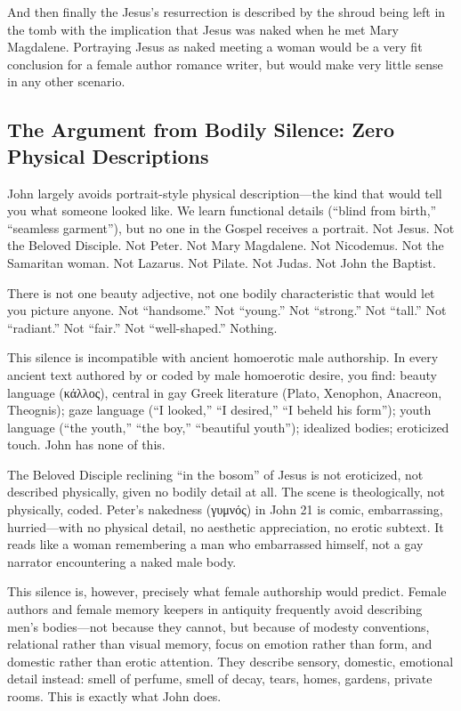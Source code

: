 And then finally the Jesus's resurrection is described by the shroud being left in the tomb with the implication that Jesus was naked when he met Mary Magdalene.
Portraying Jesus as naked meeting a woman would be a very fit conclusion for a female author romance writer, but would make very little sense in any other scenario.

\subsection{The Argument from Bodily Silence: Zero Physical Descriptions}\label{subsec:the-lack-of-description-of-physical-appearance-of-jesus-in-john-seems-to-contradict-the-idea-that-the-author-was-an-eyewitness-a-woman-and-a-lover-of-jesus.}

John largely avoids portrait-style physical description---the kind that would tell you what someone looked like.
We learn functional details (``blind from birth,'' ``seamless garment''), but no one in the Gospel receives a portrait.
Not Jesus.
Not the Beloved Disciple.
Not Peter.
Not Mary Magdalene.
Not Nicodemus.
Not the Samaritan woman.
Not Lazarus.
Not Pilate.
Not Judas.
Not John the Baptist.

There is not one beauty adjective, not one bodily characteristic that would let you picture anyone.
Not ``handsome.''
Not ``young.''
Not ``strong.''
Not ``tall.''
Not ``radiant.''
Not ``fair.''
Not ``well-shaped.''
Nothing.

This silence is incompatible with ancient homoerotic male authorship.
In every ancient text authored by or coded by male homoerotic desire, you find: beauty language (κάλλος), central in gay Greek literature (Plato, Xenophon, Anacreon, Theognis); gaze language (``I looked,'' ``I desired,'' ``I beheld his form''); youth language (``the youth,'' ``the boy,'' ``beautiful youth''); idealized bodies; eroticized touch.
John has none of this.

The Beloved Disciple reclining ``in the bosom'' of Jesus is not eroticized, not described physically, given no bodily detail at all.
The scene is theologically, not physically, coded.
Peter's nakedness (γυμνός) in John 21 is comic, embarrassing, hurried---with no physical detail, no aesthetic appreciation, no erotic subtext.
It reads like a woman remembering a man who embarrassed himself, not a gay narrator encountering a naked male body.

This silence is, however, precisely what female authorship would predict.
Female authors and female memory keepers in antiquity frequently avoid describing men's bodies---not because they cannot, but because of modesty conventions, relational rather than visual memory, focus on emotion rather than form, and domestic rather than erotic attention.
They describe sensory, domestic, emotional detail instead: smell of perfume, smell of decay, tears, homes, gardens, private rooms.
This is exactly what John does.

